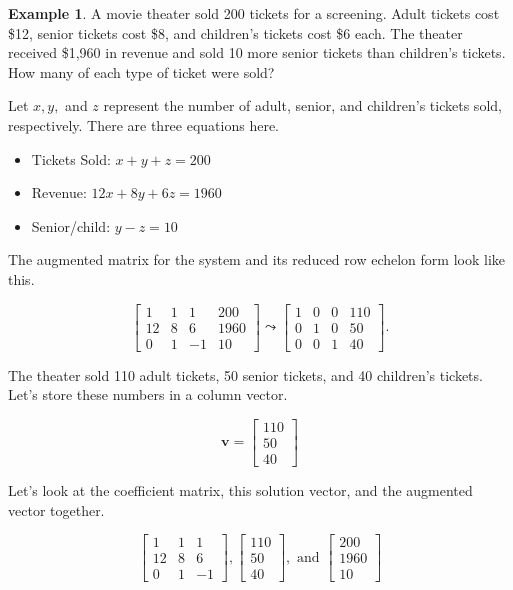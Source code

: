 \documentclass[
]{book}
\providecommand{\tightlist}{%
  \setlength{\itemsep}{0pt}\setlength{\parskip}{0pt}}
\theoremstyle{definition}
\theoremstyle{definition}
\newtheorem{example}{Example}[chapter]
\theoremstyle{definition}
\theoremstyle{definition}
\theoremstyle{remark}
\begin{document}
\begin{examplebox}

\begin{example}
A movie theater sold 200 tickets for a screening. Adult tickets cost \$12, senior tickets cost \$8, and children's tickets cost \$6 each. The theater received \$1,960 in revenue and sold 10 more senior tickets than children's tickets. How many of each type of ticket were sold?

Let \(x,y,\) and \(z\) represent the number of adult, senior, and children's tickets sold, respectively. There are three equations here.

\begin{itemize}
\tightlist
\item
  Tickets Sold: \(x+y+z=200\)
\item
  Revenue: \(12x+8y+6z=1960\)
\item
  Senior/child: \(y-z=10\)
\end{itemize}

The augmented matrix for the system and its reduced row echelon form look like this.

\[\left[\begin{array}{ccc|l} 1&1&1&200\\12 & 8 & 6 & 1960\\0 & 1 & -1 & 10\end{array}\right]\leadsto \left[\begin{array}{ccc|l} 1&0&0&110\\0 & 1 & 0 & 50\\0 & 0 & 1 & 40\end{array}\right].\]

The theater sold 110 adult tickets, 50 senior tickets, and 40 children's tickets. Let's store these numbers in a column vector.

\[\mathbf{v}=\begin{bmatrix} 110\\50\\40\end{bmatrix}\]

Let's look at the coefficient matrix, this solution vector, and the augmented vector together.

\[\begin{bmatrix}1&1&1\\12 & 8 & 6\\0 & 1 & -1 \end{bmatrix},\begin{bmatrix} 110\\50\\40\end{bmatrix},\text{ and }\begin{bmatrix} 200\\1960\\10\end{bmatrix}\]


\end{example}
\end{examplebox}
\end{document}
